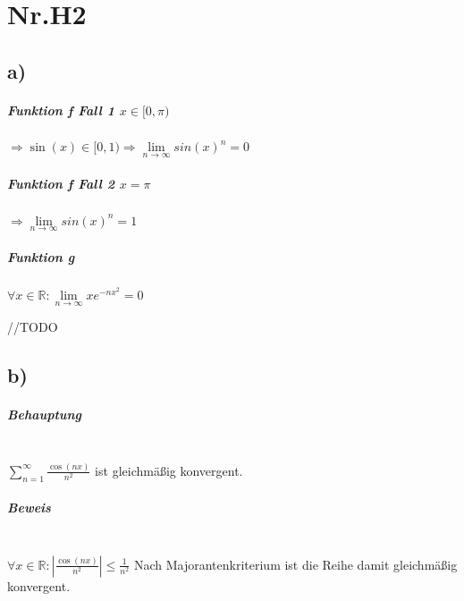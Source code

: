 \section*{Nr.H2}

\subsection*{a)}

\subparagraph*{Funktion f Fall 1 $ x \in [0,\pi) $}
$ \Rightarrow \sin(x) \in [0,1) \Rightarrow  \lim\limits_{n \to \infty} sin(x)^{n} = 0 $

\subparagraph*{Funktion f Fall 2 $ x = \pi $}
$ \Rightarrow \lim\limits_{n \to \infty} sin(x)^{n} = 1 $


\subparagraph*{Funktion g}
$\forall x \in \mathbb{R} : \lim\limits_{n \to \infty}xe^{-nx^{2}} = 0$
\begin{large}
//TODO 
\end{large}


\subsection*{b)}

\subparagraph*{Behauptung} ~\\
\indent $\sum\limits_{n=1}^\infty \frac{\cos(nx)}{n^{2}}$ ist gleichmäßig konvergent.

\subparagraph*{Beweis} ~\\
\indent $ \forall x \in \mathbb{R} : |\frac{\cos(nx)}{n^{2}}| \leq \frac{1}{n^{2}} $
Nach Majorantenkriterium ist die Reihe damit gleichmäßig konvergent.

